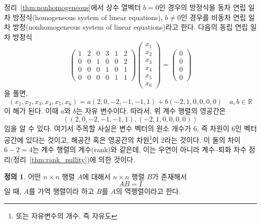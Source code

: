 \documentclass[unfonts,oneside,a4paper]{oblivoir}
\theoremstyle{definition}
\newtheorem{definition}{정의}[section]
\theoremstyle{theorem}
\theoremstyle{theorem}
\theoremstyle{remark}
\theoremstyle{remark}
\theoremstyle{remark}
\theoremstyle{remark}
\renewcommand{\vec}[1]{\bm{\mathit{#1}}}
\newcommand{\vecz}{\bm{\mathrm{0}}}
\begin{document}
정리~\ref{thm:nonhomogeneous}에서 상수 열벡터 $\vec b = \vecz$인 경우의 방정식을 동차 연립 일차 방정식(homogeneous system of linear equations), $\vec b \neq \vecz$인 경우를 비동차 연립 일차 방정(nonhomogeneous system of linear equations)라고 한다.
다음의 동립 연립 일차 방정식
\begin{equation*}
    \begin{pmatrix}
        1 & 2 & 0 & 3 & 1 & 2\\
        0 & 0 & 1 & 0 & 0 & 2\\
        0 & 0 & 0 & 1 & 0 & 1\\
        0 & 0 & 0 & 0 & 1 & 1
    \end{pmatrix}
    \begin{pmatrix}
        x_1\\
        x_2\\
        x_3\\
        x_4\\
        x_5\\
        x_6
    \end{pmatrix}
    =
    \begin{pmatrix}
        0\\
        0\\
        0\\
        0
    \end{pmatrix}
\end{equation*}
을 풀면,
\begin{equation*}
    (x_1, x_2, x_3, x_4, x_5, x_6) = a(2, 0, -2, -1, -1, 1) + b(-2, 1, 0, 0, 0, 0)\quad a, b \in \mathbb R
\end{equation*}
이 해가 된다.
이때 $a$와 $b$는 자유 변수이다.
따라서, 위 계수 행렬의 영공간은
\begin{equation*}
    \left<(2, 0, -2, -1, -1, 1), (-2, 1, 0, 0, 0, 0)\right>
\end{equation*}
임을 알 수 있다.
여기서 주목할 사실은 변수 벡터의 원소 개수가 6, 즉 차원이 6인 벡터공간에 있다는 것이고, 해공간 혹은 영공간의 차원\footnote{또는 자유변수의 개수, 즉 자유도}이 2라는 것이다.
이 둘의 차이 $6 - 2 = 4$는 계수 행렬의 계수(rank)와 같은데, 이는 우연이 아니라 계수--퇴화 차수 정리(정리~\ref{thm:rank_nullity})에 의한 것이다.

\begin{definition}
    어떤 $n \times n$ 행렬 $A$에 대해서 $n \times n$ 행렬 $B$가 존재해서
    \begin{equation*}
        A B = I
    \end{equation*}
    일 때, $A$를 가역 행렬이라 하고 $B$를 $A$의 역행렬이라고 한다.
\end{definition}
\end{document}
